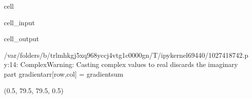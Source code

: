 \documentclass[letterpaper,10pt,english]{jupyterBook}
\begin{document}
\begin{sphinxuseclass}{cell}\begin{sphinxVerbatimInput}

\begin{sphinxuseclass}{cell_input}
\begin{sphinxVerbatim}[commandchars=\\\{\}]
     
\end{sphinxVerbatim}

\end{sphinxuseclass}\end{sphinxVerbatimInput}
\begin{sphinxVerbatimOutput}

\begin{sphinxuseclass}{cell_output}
\begin{sphinxVerbatim}[commandchars=\\\{\}]
/var/folders/\PYGZus{}b/trlmhkgj5xq968yccj4vtg1c0000gn/T/ipykernel\PYGZus{}69440/1027418742.py:14: ComplexWarning: Casting complex values to real discards the imaginary part
  gradient\PYGZus{}arr[row,col] = gradient\PYGZus{}sum
\end{sphinxVerbatim}

\begin{sphinxVerbatim}[commandchars=\\\{\}]
(\PYGZhy{}0.5, 79.5, 79.5, \PYGZhy{}0.5)
\end{sphinxVerbatim}

\noindent{}

\end{sphinxuseclass}\end{sphinxVerbatimOutput}

\end{sphinxuseclass}
\end{document}
